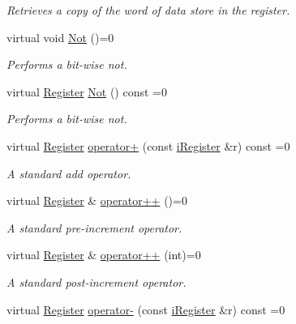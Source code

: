 \begin{DoxyCompactItemize}
\begin{DoxyCompactList}\small\item\em Retrieves a copy of the word of data store in the register. \item\end{DoxyCompactList}\item 
virtual void \hyperlink{classiRegister_af4bbbe945b151dee3f1743c43a451cb3}{Not} ()=0
\begin{DoxyCompactList}\small\item\em Performs a bit-\/wise not. \item\end{DoxyCompactList}\item 
virtual \hyperlink{classRegister}{Register} \hyperlink{classiRegister_aca99e377de5cd1ef136a850d85143cf3}{Not} () const =0
\begin{DoxyCompactList}\small\item\em Performs a bit-\/wise not. \item\end{DoxyCompactList}\item 
virtual \hyperlink{classRegister}{Register} \hyperlink{classiRegister_af8ab19234f44a0bade65cb35fd2cd036}{operator+} (const \hyperlink{classiRegister}{iRegister} \&r) const =0
\begin{DoxyCompactList}\small\item\em A standard add operator. \item\end{DoxyCompactList}\item 
virtual \hyperlink{classRegister}{Register} \& \hyperlink{classiRegister_abca2bcea556d63fb4e3504df221cdc62}{operator++} ()=0
\begin{DoxyCompactList}\small\item\em A standard pre-\/increment operator. \item\end{DoxyCompactList}\item 
virtual \hyperlink{classRegister}{Register} \& \hyperlink{classiRegister_a36e6e1bfbc6a9fe203e8fb5b9f6396cb}{operator++} (int)=0
\begin{DoxyCompactList}\small\item\em A standard post-\/increment operator. \item\end{DoxyCompactList}\item 
virtual \hyperlink{classRegister}{Register} \hyperlink{classiRegister_a01f837097cb87ec33fdc1cef606e1842}{operator-\/} (const \hyperlink{classiRegister}{iRegister} \&r) const =0

\end{DoxyCompactItemize}
